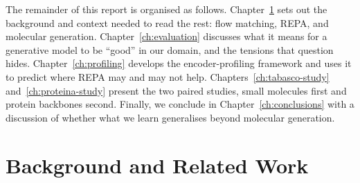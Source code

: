 \documentclass[12pt,a4paper,twoside]{report}
\begin{document}
The remainder of this report is organised as follows. Chapter~\ref{ch:background} sets out the background and context needed to read the rest: flow matching, REPA, and molecular generation. Chapter~\ref{ch:evaluation} discusses what it means for a generative model to be ``good'' in our domain, and the tensions that question hides. Chapter~\ref{ch:profiling} develops the encoder-profiling framework and uses it to predict where REPA may and may not help. Chapters~\ref{ch:tabasco-study} and~\ref{ch:proteina-study} present the two paired studies, small molecules first and protein backbones second. Finally, we conclude in Chapter~\ref{ch:conclusions} with a discussion of whether what we learn generalises beyond molecular generation.

\chapter{Background and Related Work}
\label{ch:background}
\end{document}
